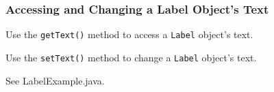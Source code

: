 \documentclass{beamer}
\newcommand{\mil}[1]{\texttt{#1}}
\begin{document}
\begin{frame}[fragile]

    \frametitle{Accessing and Changing a Label Object's Text}
    
    Use the \mil{getText()} method to access a \mil{Label} object's text.
    
    \bigskip
    
    Use the \mil{setText()} method to change a \mil{Label} object's text. 
    
\end{frame}

\begin{frame}

    See  LabelExample.java.
    
\end{frame}
\end{document}
